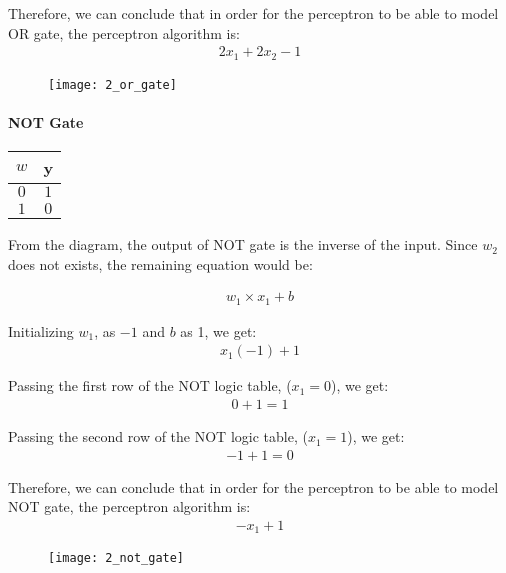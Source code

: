 Therefore, we can conclude that in order for the perceptron to be able to model OR gate, the perceptron algorithm is:
\begin{align}
	2x_1 + 2x_2 - 1
\end{align}

\begin{figure}[H]
	\centering
	\texttt{[image: 2\_or\_gate]}
\end{figure}

\paragraph{NOT Gate}

\begin{flushleft}
	\begin{table}[H]
		\centering
		\begin{tabular}{|c|c|}
			\hline
			$w$  & y \\
			\hline
			$0$ & $1$    \\
			$1$ & $0$    \\
			\hline
		\end{tabular}
	\end{table}
\end{flushleft}

From the diagram, the output of NOT gate is the inverse of the input. Since $w_2$ does not exists, the remaining equation would be:

\begin{align}
	w_1\times x_1 + b
\end{align}

Initializing $w_1$, as $-1$ and $b$ as 1, we get:
\begin{align}
	x_1(-1) + 1
\end{align}

Passing the first row of the NOT logic table, ($x_1 = 0$), we get:
\begin{align}
	0 + 1 = 1
\end{align}

Passing the second row of the NOT logic table, ($x_1 = 1$), we get:
\begin{align}
	-1 + 1 = 0
\end{align}

Therefore, we can conclude that in order for the perceptron to be able to model NOT gate, the perceptron algorithm is:
\begin{align}
	-x_1 + 1
\end{align}

\begin{figure}[H]
	\centering
	\texttt{[image: 2\_not\_gate]}
\end{figure}


